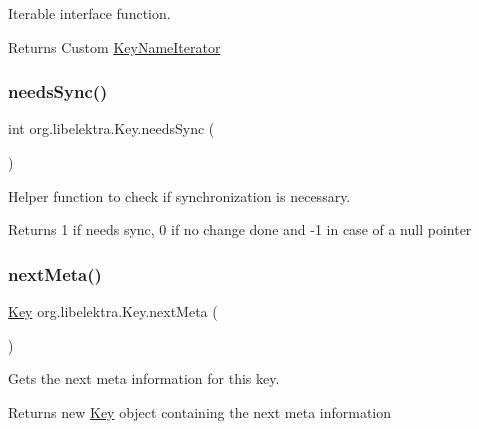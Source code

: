 Iterable interface function. 

\begin{DoxyReturn}{Returns}
Custom \hyperlink{classorg_1_1libelektra_1_1KeyNameIterator}{Key\+Name\+Iterator} 
\end{DoxyReturn}
\mbox{\label{classorg_1_1libelektra_1_1Key_a6f5afab907a28b264af0981e9db58c64}} 
\subsubsection{\texorpdfstring{needs\+Sync()}{needsSync()}}
{\footnotesize\ttfamily int org.\+libelektra.\+Key.\+needs\+Sync (\begin{DoxyParamCaption}{ }\end{DoxyParamCaption})\hspace{0.3cm}{\ttfamily [inline]}}



Helper function to check if synchronization is necessary. 

\begin{DoxyReturn}{Returns}
1 if needs sync, 0 if no change done and -\/1 in case of a null pointer 
\end{DoxyReturn}
\mbox{\label{classorg_1_1libelektra_1_1Key_ace2853c3ca003e9099272871a6d61ad6}} 
\subsubsection{\texorpdfstring{next\+Meta()}{nextMeta()}}
{\footnotesize\ttfamily \hyperlink{classorg_1_1libelektra_1_1Key}{Key} org.\+libelektra.\+Key.\+next\+Meta (\begin{DoxyParamCaption}{ }\end{DoxyParamCaption})\hspace{0.3cm}{\ttfamily [inline]}}



Gets the next meta information for this key. 

\begin{DoxyReturn}{Returns}
new \hyperlink{classorg_1_1libelektra_1_1Key}{Key} object containing the next meta information 
\end{DoxyReturn}
\mbox{\label{classorg_1_1libelektra_1_1Key_a75d331aed753dff2fb13f9aaa47cf09c}} 
